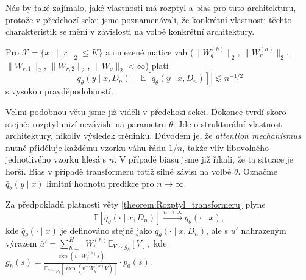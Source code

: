 Nás by také zajímalo, jaké vlastnosti má rozptyl a bias pro tuto architekturu, protože v předchozí sekci jsme poznamenávali, že konkrétní vlastnosti těchto charakteristik se mění v závislosti na volbě konkrétní architektury.
\begin{theorem}
    Pro $\mathcal{X} = \{x : \|x\|_2 \leq K\}$ a omezené matice vah ($\|W^{(h)}_q\|_2$, $\|W^{(h)}_v\|_2$, $\|W_{r,1}\|_2$, $\|W_{r,2}\|_2$, ${\|W_o\|_2 < \infty}$) platí
    \begin{equation}
            \left|q_\theta(y \mid x, D_n) - \mathbb{E}[q_\theta(y \mid x, D_n)]\right| \lesssim n^{-1/2}
    \end{equation}
s vysokou pravděpodobností.
\label{theorem:Rozptyl_transformeru}
\end{theorem}

Velmi podobnou větu jsme již viděli v předchozí sekci.
Dokonce tvrdí skoro stejné: rozptyl mizí nezávisle na parametru $\theta$.
Jde o strukturální vlastnost architektury, nikoliv výsledek tréninku. 
Důvodem je, že \emph{attention mechanismus} nutně přiděluje každému vzorku váhu řádu $1/n$, takže vliv libovolného jednotlivého vzorku klesá s $n$.
V případě biasu jsme již říkali, že ta situace je horší. 
Bias v případě transformeru totiž silně závisí na volbě $\theta$.
Označme $\bar{q}_\theta(y \mid x)$ limitní hodnotu predikce pro $n \to \infty$.
\begin{theorem}
    Za předpokladů platnosti věty \ref{theorem:Rozptyl_transformeru} plyne
    \begin{equation}
            \mathbb{E}[q_\theta(\cdot \mid x, D_n)] \xrightarrow{n \to \infty} \bar{q}_\theta(\cdot \mid x),
    \end{equation}
    kde $\bar{q}_\theta(\cdot \mid x)$ je definováno stejně jako $q_\theta(\cdot \mid x, D_n)$, ale s $u'$ nahrazeným výrazem $\bar{u}' = \sum_{h=1}^{H} W^{(h)}_v \mathbb{E}_{V \sim g_h}[V],$
    kde $g_h(s) = \frac{\exp(v^\top W^{(h)}_q s)}{\mathbb{E}_{V \sim p_0}[\exp(v^\top W^{(h)}_q V)]} \cdot p_0(s).$
\end{theorem}

